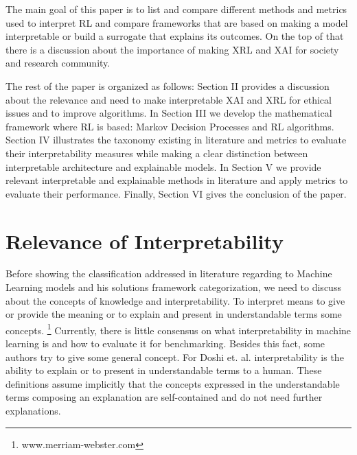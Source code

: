 \documentclass[runningheads]{llncs}
\begin{document}
The main goal of this paper is to list and compare different methods and metrics used to interpret RL and compare frameworks that are based on making a model interpretable or build a surrogate that explains its outcomes. On the top of that there is a discussion about the importance of making XRL and XAI for society and research community. 

The rest of the paper is organized as follows: Section II provides a discussion about the relevance and need to make interpretable XAI and XRL for ethical issues and to improve algorithms. In Section III we develop the mathematical framework where RL is based: Markov Decision Processes and RL algorithms. Section IV illustrates the taxonomy existing in literature and metrics to evaluate their interpretability measures while making a clear distinction between interpretable architecture and explainable models. In Section V we provide relevant interpretable and explainable methods in literature and apply metrics to evaluate their performance. Finally, Section VI gives the conclusion of the paper.


\section{Relevance of Interpretability}

Before showing the classification addressed in literature regarding to Machine Learning models and his solutions framework categorization, we need to discuss about the concepts of knowledge and interpretability. To interpret means to give or provide the meaning or to explain and present in understandable terms some concepts. \footnote{www.merriam-webster.com} Currently, there is little consensus on what interpretability in machine learning is and how to evaluate it for benchmarking. Besides this fact, some authors try to give some general concept. For Doshi et. al. \cite{Doshi-velez2017}  interpretability is the ability to explain or to present in understandable terms to a human. These definitions assume implicitly that the concepts expressed in the understandable terms composing an explanation are self-contained and do not need further explanations. \cite{Guidotti2018}
\end{document}
